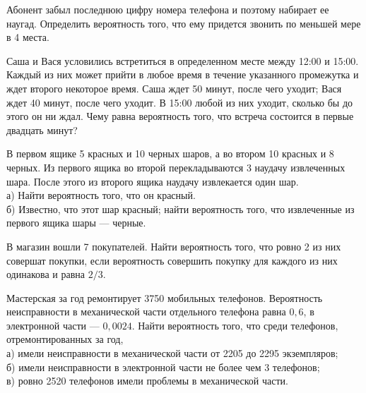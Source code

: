 \newpage\setcounter{zad}{0}



\begin{zkrW}{20}\noindent 
	Абонент забыл последнюю цифру номера телефона и поэтому набирает ее наугад. Определить вероятность того, что ему придется звонить по меньшей мере в 4 места.
 
\end{zkrW}

\begin{zkrW}{20}\noindent 
	Саша и Вася условились встретиться в определенном месте между 12:00 и 15:00. Каждый из них может прийти в любое время в течение указанного промежутка и ждет второго некоторое время. Саша ждет 50 минут, после чего уходит; Вася ждет 40 минут, после чего уходит. В 15:00 любой из них уходит, сколько бы до этого он ни ждал. Чему равна вероятность того, что встреча состоится в первые двадцать минут?
 
\end{zkrW}

\begin{zkrW}{20}\noindent 
	В первом ящике 5 красных и 10 черных шаров, а во втором 10 красных и 8 черных. Из первого ящика во второй перекладываются 3 наудачу извлеченных шара. После этого из второго ящика наудачу извлекается один шар. \\ \indent а) Найти вероятность того, что он красный. \\ \indent б) Известно, что этот шар красный; найти вероятность того, что извлеченные из первого ящика шары --- черные.
 
\end{zkrW}

\begin{zkrW}{20}\noindent 
	В магазин вошли 7 покупателей. Найти вероятность того, что ровно 2 из них совершат покупки, если вероятность совершить покупку для каждого из них одинакова и равна $2/3$.
 
\end{zkrW}

\begin{zkrW}{20}\noindent 
	Мастерская за год ремонтирует 3750 мобильных телефонов. Вероятность неисправности в механической части отдельного телефона равна $0{,}6$, в электронной части --- $0{,}0024$. Найти вероятность того, что среди телефонов, отремонтированных за год, \\ \indent а) имели неисправности в механической части от 2205 до 2295 экземпляров; \\ \indent б) имели неисправности в электронной части не более чем 3 телефонов; \\ \indent в) ровно 2520 телефонов имели проблемы в механической части.
 
\end{zkrW}

\newpage\setcounter{zad}{0}

